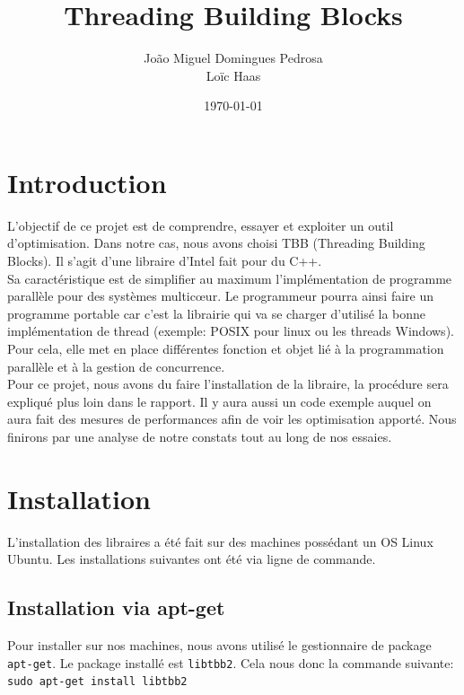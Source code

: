 \documentclass[10pt,a4paper]{article}
\author{João Miguel Domingues Pedrosa \\ Loïc Haas}
\title{Threading Building Blocks}
\date{\today}
\begin{document}
\maketitle
\newpage
\tableofcontents
\newpage


\section{Introduction}
L'objectif de ce projet est de comprendre, essayer et exploiter un outil d'optimisation. Dans notre cas, nous avons choisi TBB (Threading Building Blocks). Il s'agit d'une libraire d'Intel fait pour du C++. \\

Sa caractéristique est de simplifier au maximum l'implémentation de programme parallèle pour des systèmes multicœur. Le programmeur pourra ainsi faire un programme portable car c'est la librairie qui va se charger d'utilisé la bonne implémentation de thread (exemple: POSIX pour linux ou les threads Windows). Pour cela, elle met en place différentes fonction et objet lié à la programmation parallèle et à la gestion de concurrence.\\

Pour ce projet, nous avons du faire l'installation de la libraire, la procédure sera expliqué plus loin dans le rapport. Il y aura aussi un code exemple auquel on aura fait des mesures de performances afin de voir les optimisation apporté. Nous finirons par une analyse de notre constats tout au long de nos essaies.
\newpage

\section{Installation}
L'installation des libraires a été fait sur des machines possédant un OS Linux Ubuntu. Les installations suivantes ont été via ligne de commande.

\subsection{Installation via apt-get}

Pour installer sur nos machines, nous avons utilisé le gestionnaire de package \texttt{apt-get}. Le package installé est \texttt{libtbb2}. Cela nous donc la commande suivante:\\

\texttt{sudo apt-get install libtbb2}\\
\end{document}
